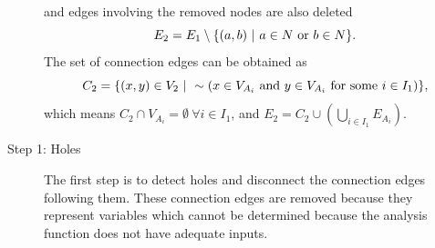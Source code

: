 \begin{description}
\begin{equation}
        \end{equation}
        and edges involving the removed nodes are also deleted
        \begin{equation}
        E_2 = E_1 \setminus \{ (a,b) \ | \  a \in N \textrm{ or } b \in N  \}.
        \end{equation}
        The set of connection edges can be obtained as
        \begin{equation}
        C_2 = \{(x,y) \in V_{2} \ | \  \sim(x \in V_{A_i} \textrm{ and } y \in V_{A_i} \textrm{ for some } i \in I_1)\},
        \end{equation}
        which means $C_2 \cap V_{A_i} = \emptyset  \ \forall i \in I_1$, and $E_2 = C_2 \cup \left( \bigcup_{i \in I_1} E_{A_i} \right)$. 

    \item[Step 1: Holes] 
        The first step is to detect holes and disconnect the connection edges following them. 
        These connection edges are removed because they represent variables which cannot be determined because the analysis function does not have adequate inputs. 


\end{description}
